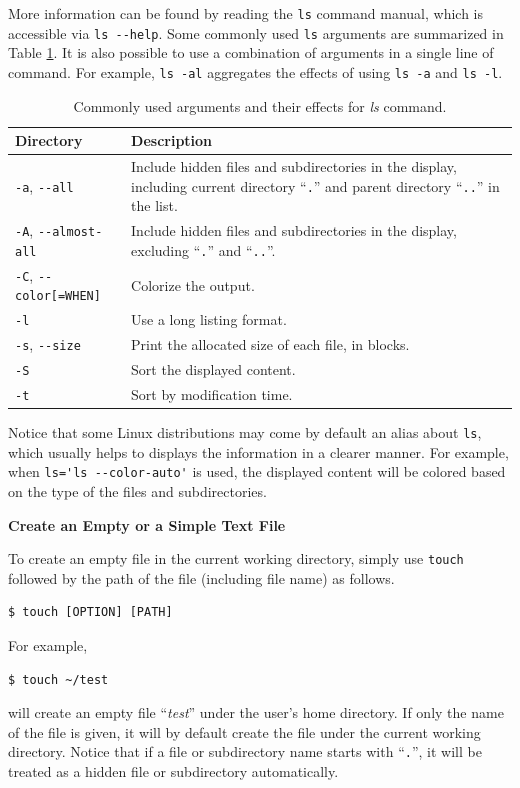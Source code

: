 More information can be found by reading the \verb|ls| command manual, which is accessible via \verb|ls --help|. Some commonly used \verb|ls| arguments are summarized in Table \ref{ch4tab:lscommandargument}. It is also possible to use a combination of arguments in a single line of command. For example, \verb|ls -al| aggregates the effects of using \verb|ls -a| and \verb|ls -l|.

\begin{table}
  \centering \caption{Commonly used arguments and their effects for \textit{ls} command.}\label{ch4tab:lscommandargument}
  \begin{tabularx}{\textwidth}{lX}
    \hline
    Directory & Description \\ \hline
    \verb|-a|, \verb|--all| & Include hidden files and subdirectories in the display, including current directory ``\verb|.|'' and parent directory ``\verb|..|'' in the list. \\ \hdashline
    \verb|-A|, \verb|--almost-all| & Include hidden files and subdirectories in the display, excluding ``\verb|.|'' and ``\verb|..|''. \\ \hdashline
    \verb|-C|, \verb|--color[=WHEN]| & Colorize the output. \\ \hdashline
    \verb|-l| & Use a long listing format. \\ \hdashline
    \verb|-s|, \verb|--size| & Print the allocated size of each file, in blocks. \\ \hdashline
    \verb|-S| & Sort the displayed content. \\ \hdashline
    \verb|-t| & Sort by modification time. \\
    \hline
  \end{tabularx}
\end{table}

Notice that some Linux distributions may come by default an alias about \verb|ls|, which usually helps to displays the information in a clearer manner. For example, when \verb|ls='ls --color-auto'| is used, the displayed content will be colored based on the type of the files and subdirectories.

\textbf{Create an Empty or a Simple Text File}

To create an empty file in the current working directory, simply use \verb|touch| followed by the path of the file (including file name) as follows.
\begin{lstlisting}
$ touch [OPTION] [PATH]
\end{lstlisting}
For example,
\begin{lstlisting}
$ touch ~/test
\end{lstlisting}
will create an empty file ``\textit{test}'' under the user's home directory. If only the name of the file is given, it will by default create the file under the current working directory. Notice that if a file or subdirectory name starts with ``\verb|.|'', it will be treated as a hidden file or subdirectory automatically.

